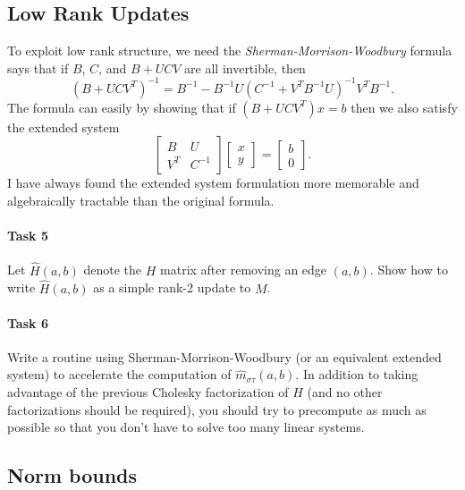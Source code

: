 \documentclass[12pt, leqno]{article}
\begin{document}
\subsection*{Low Rank Updates}

To exploit low rank structure, we need the
{\em Sherman-Morrison-Woodbury} formula says that if $B$, $C$, and
$B+UCV$ are all invertible, then
\[
  (B + UCV^T)^{-1} = B^{-1} - B^{-1} U (C^{-1} + V^T B^{-1} U)^{-1} V^T B^{-1}.
\]
The formula can easily by showing that if $(B+UCV^T) x = b$ then we
also satisfy the extended system
\[
\begin{bmatrix}
  B & U \\
  V^T & C^{-1}
\end{bmatrix}
\begin{bmatrix}
  x \\ y
\end{bmatrix} =
\begin{bmatrix}
  b \\ 0
\end{bmatrix}.
\]
I have always found the extended system formulation more memorable and
algebraically tractable than the original formula.

\paragraph*{Task 5}
Let $\hat{H}(a,b)$ denote the $H$ matrix after removing an edge
$(a,b)$.  Show how to write $\hat{H}(a,b)$ as a simple rank-2 update
to $M$.

\paragraph*{Task 6}
Write a routine using Sherman-Morrison-Woodbury (or an equivalent
extended system) to accelerate the computation of
$\hat{m}_{\sigma \tau}(a,b)$.  In
addition to taking advantage of the previous Cholesky factorization of
$H$ (and no other factorizations should be required), you should try
to precompute as much as possible so that you don't have to solve too
many linear systems.

\subsection*{Norm bounds}
\end{document}
